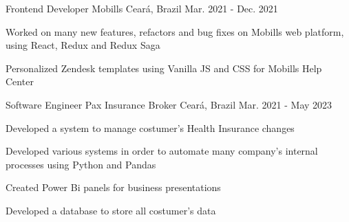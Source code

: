 \begin{cventries}
\cventry
{Frontend Developer} %
{Mobills} %
{Ceará, Brazil} %
{Mar. 2021 - Dec. 2021} %
{
  \begin{cvitems} %
    \item {Worked on many new features,
    refactors and bug fixes on Mobills
    web platform, using React, Redux
    and Redux Saga}
    \item {Personalized Zendesk templates
    using Vanilla JS and CSS for
    Mobills Help Center}
  \end{cvitems}
}

  \cventry
    {Software Engineer} %
    {Pax Insurance Broker} %
    {Ceará, Brazil} %
    {Mar. 2021 - May 2023} %
    {
      \begin{cvitems} %
        \item {Developed a system to manage costumer's Health Insurance changes}
        \item {Developed various systems in order to automate many company's internal processes using Python and Pandas}
        \item {Created Power Bi panels for business presentations}
        \item {Developed a database to store
        all costumer's data}
      \end{cvitems}
  }

\end{cventries}
